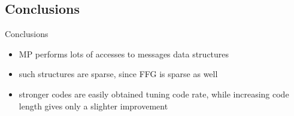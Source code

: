 \documentclass{beamer}
\begin{document}
\begin{darkframes}
  \section{Conclusions}
  \begin{frame}{Conclusions}
    \begin{itemize}
      \item MP performs lots of accesses to messages data structures
      \item such structures are sparse, since FFG is sparse as well
    \end{itemize}

    \begin{itemize}
      \item stronger codes are easily obtained tuning code rate, while increasing code length gives only a slighter improvement


    \end{itemize}
  \end{frame}
\end{darkframes}
\end{document}
